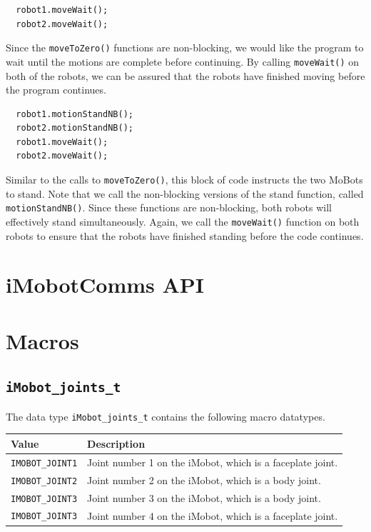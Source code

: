 \documentclass{article}
\begin{document}
\begin{verbatim}
  robot1.moveWait();
  robot2.moveWait();
\end{verbatim}
Since the \texttt{moveToZero()} functions are non-blocking, we would like
the program to wait until the motions are complete before continuing. By
calling \texttt{moveWait()} on both of the robots, we can be assured that
the robots have finished moving before the program continues.

\begin{verbatim}
  robot1.motionStandNB();
  robot2.motionStandNB();
  robot1.moveWait();
  robot2.moveWait();
\end{verbatim}
Similar to the calls to \texttt{moveToZero()}, this block of code instructs 
the two MoBots to stand. Note that we call the non-blocking versions of the
stand function, called \texttt{motionStandNB()}. Since these functions are
non-blocking, both robots will effectively stand simultaneously. Again,
we call the \texttt{moveWait()} function on both robots to ensure that 
the robots have finished standing before the code continues.

\newpage
\appendix
\section{iMobotComms API}


\section{Macros}

\subsection{\texttt{iMobot\_joints\_t}}
The data type \texttt{iMobot\_joints\_t} contains the following macro datatypes.\\

\begin{tabular}{p{3cm}p{7cm}} \hline 
Value & Description \\
\hline 
\texttt{IMOBOT\_JOINT1} & Joint number 1 on the iMobot, which is a faceplate joint. \\
\texttt{IMOBOT\_JOINT2} & Joint number 2 on the iMobot, which is a body joint. \\
\texttt{IMOBOT\_JOINT3} & Joint number 3 on the iMobot, which is a body joint. \\
\texttt{IMOBOT\_JOINT3} & Joint number 4 on the iMobot, which is a faceplate joint. 
\end{tabular}
\end{document}
